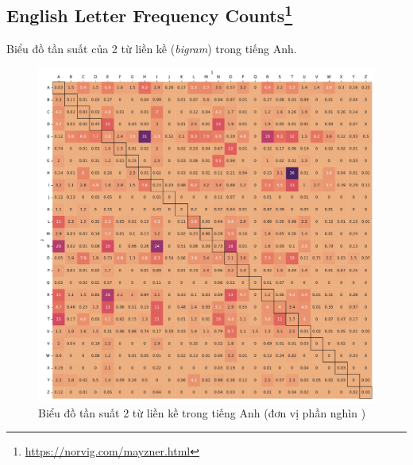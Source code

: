 \subsection*{English Letter Frequency Counts\footnote{\url{https://norvig.com/mayzner.html}}}
Biểu đồ tần suất của 2 từ liền kề (\textit{bigram}) trong tiếng Anh.
\begin{figure}[htb]
    \centering
    \includegraphics[width=\textwidth]{chapter_2/image/norvig_bigram_frequency.pdf}
    \caption{Biểu đồ tần suất 2 từ liền kề trong tiếng Anh (đơn vị phần nghìn \textperthousand)}
    \label{figure:english_bigram_frequency}
\end{figure}

\newpage

